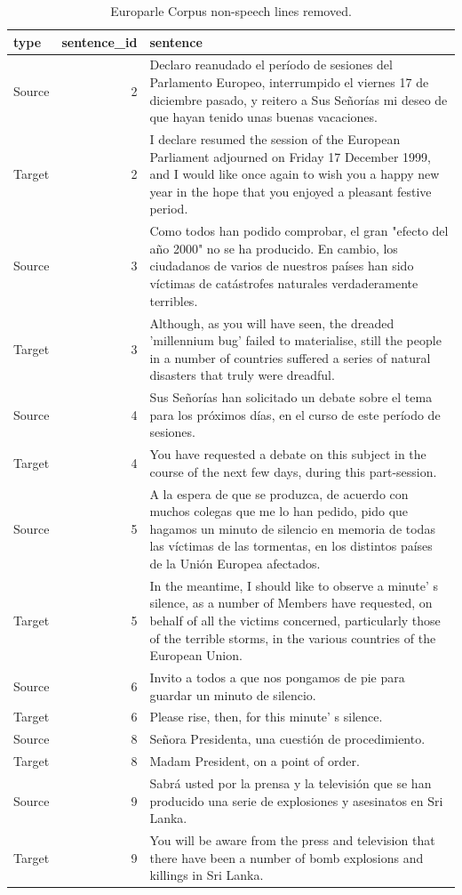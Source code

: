 \documentclass[
  letterpaper,
]{scrbook}
\begin{document}
\hypertarget{tbl-td-europarle-preview-2}{}
\begin{table}
\caption{\label{tbl-td-europarle-preview-2}Europarle Corpus non-speech lines removed. }\tabularnewline

\centering
\begin{tabular}{lrl}
\toprule
type & sentence\_id & sentence\\
\midrule
Source & 2 & Declaro reanudado el período de sesiones del Parlamento Europeo, interrumpido el viernes 17 de diciembre pasado, y reitero a Sus Señorías mi deseo de que hayan tenido unas buenas vacaciones.\\
Target & 2 & I declare resumed the session of the European Parliament adjourned on Friday 17 December 1999, and I would like once again to wish you a happy new year in the hope that you enjoyed a pleasant festive period.\\
Source & 3 & Como todos han podido comprobar, el gran "efecto del año 2000" no se ha producido. En cambio, los ciudadanos de varios de nuestros países han sido víctimas de catástrofes naturales verdaderamente terribles.\\
Target & 3 & Although, as you will have seen, the dreaded 'millennium bug' failed to materialise, still the people in a number of countries suffered a series of natural disasters that truly were dreadful.\\
Source & 4 & Sus Señorías han solicitado un debate sobre el tema para los próximos días, en el curso de este período de sesiones.\\
\addlinespace
Target & 4 & You have requested a debate on this subject in the course of the next few days, during this part-session.\\
Source & 5 & A la espera de que se produzca, de acuerdo con muchos colegas que me lo han pedido, pido que hagamos un minuto de silencio en memoria de todas las víctimas de las tormentas, en los distintos países de la Unión Europea afectados.\\
Target & 5 & In the meantime, I should like to observe a minute' s silence, as a number of Members have requested, on behalf of all the victims concerned, particularly those of the terrible storms, in the various countries of the European Union.\\
Source & 6 & Invito a todos a que nos pongamos de pie para guardar un minuto de silencio.\\
Target & 6 & Please rise, then, for this minute' s silence.\\
\addlinespace
Source & 8 & Señora Presidenta, una cuestión de procedimiento.\\
Target & 8 & Madam President, on a point of order.\\
Source & 9 & Sabrá usted por la prensa y la televisión que se han producido una serie de explosiones y asesinatos en Sri Lanka.\\
Target & 9 & You will be aware from the press and television that there have been a number of bomb explosions and killings in Sri Lanka.\\
\bottomrule
\end{tabular}
\end{table}
\end{document}

